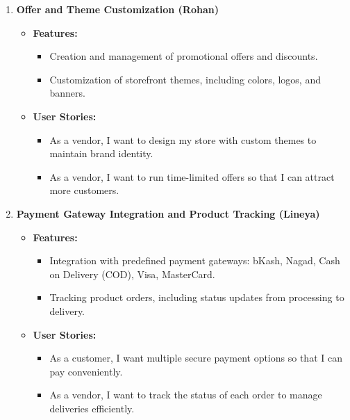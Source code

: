 \begin{enumerate}
    \item \textbf{Offer and Theme Customization (Rohan)}
    \begin{itemize}
        \item \textbf{Features:}
        \begin{itemize}
            \item Creation and management of promotional offers and discounts.
            \item Customization of storefront themes, including colors, logos, and banners.
        \end{itemize}
        \item \textbf{User Stories:}
        \begin{itemize}
            \item As a vendor, I want to design my store with custom themes to maintain brand identity.
            \item As a vendor, I want to run time-limited offers so that I can attract more customers.
        \end{itemize}
    \end{itemize}

    \item \textbf{Payment Gateway Integration and Product Tracking (Lineya)}
    \begin{itemize}
        \item \textbf{Features:}
        \begin{itemize}
            \item Integration with predefined payment gateways: bKash, Nagad, Cash on Delivery (COD), Visa, MasterCard.
            \item Tracking product orders, including status updates from processing to delivery.
        \end{itemize}
        \item \textbf{User Stories:}
        \begin{itemize}
            \item As a customer, I want multiple secure payment options so that I can pay conveniently.
            \item As a vendor, I want to track the status of each order to manage deliveries efficiently.
        \end{itemize}
    \end{itemize}


\end{enumerate}

